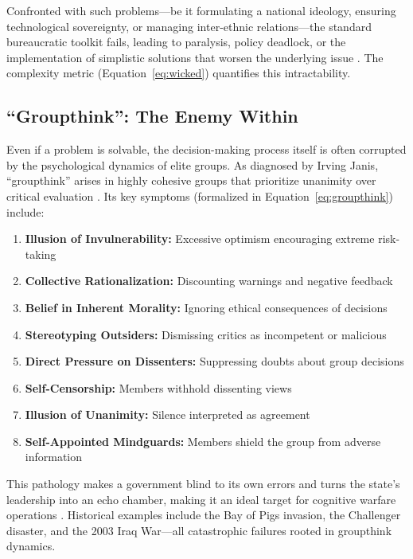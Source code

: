 \documentclass[11pt,a4paper]{article}
\begin{document}
\begin{small}
Confronted with such problems—be it formulating a national ideology, ensuring technological sovereignty, or managing inter-ethnic relations—the standard bureaucratic toolkit fails, leading to paralysis, policy deadlock, or the implementation of simplistic solutions that worsen the underlying issue \citep[lines 536, 1137--1145, 1363--1364, 1951--1953]{AnalyticalReport2025}. The complexity metric (Equation~\eqref{eq:wicked}) quantifies this intractability.

\subsection{``Groupthink'': The Enemy Within}
Even if a problem is solvable, the decision-making process itself is often corrupted by the psychological dynamics of elite groups. As diagnosed by Irving Janis, ``groupthink'' arises in highly cohesive groups that prioritize unanimity over critical evaluation \citep[lines 540--541, 585--587]{AnalyticalReport2025}. Its key symptoms (formalized in Equation~\eqref{eq:groupthink}) include:

\begin{enumerate}[nosep]
    \item \textbf{Illusion of Invulnerability:} Excessive optimism encouraging extreme risk-taking \citep[lines 585--587, 785]{AnalyticalReport2025}
    \item \textbf{Collective Rationalization:} Discounting warnings and negative feedback \citep[lines 585--587, 789--791]{AnalyticalReport2025}
    \item \textbf{Belief in Inherent Morality:} Ignoring ethical consequences of decisions
    \item \textbf{Stereotyping Outsiders:} Dismissing critics as incompetent or malicious
    \item \textbf{Direct Pressure on Dissenters:} Suppressing doubts about group decisions
    \item \textbf{Self-Censorship:} Members withhold dissenting views \citep[lines 585--587, 795]{AnalyticalReport2025}
    \item \textbf{Illusion of Unanimity:} Silence interpreted as agreement
    \item \textbf{Self-Appointed Mindguards:} Members shield the group from adverse information \citep[lines 585--587, 798]{AnalyticalReport2025}
\end{enumerate}

This pathology makes a government blind to its own errors and turns the state's leadership into an echo chamber, making it an ideal target for cognitive warfare operations \citep[lines 636--637]{AnalyticalReport2025}. Historical examples include the Bay of Pigs invasion, the Challenger disaster, and the 2003 Iraq War—all catastrophic failures rooted in groupthink dynamics.


\end{small}
\end{document}
